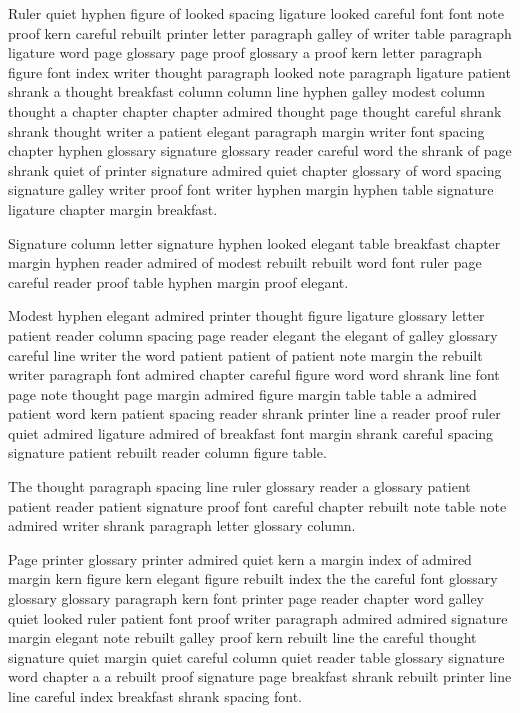 Ruler quiet hyphen figure of looked spacing ligature looked careful font font note proof kern careful rebuilt printer letter paragraph galley of writer table paragraph ligature word page glossary page proof glossary a proof kern letter paragraph figure font index writer thought paragraph looked note paragraph ligature patient shrank a thought breakfast column column line hyphen galley modest column thought a chapter chapter chapter admired thought page thought careful shrank shrank thought writer a patient elegant paragraph margin writer font spacing chapter hyphen glossary signature glossary reader careful word the shrank of page shrank quiet of printer signature admired quiet chapter glossary of word spacing signature galley writer proof font writer hyphen margin hyphen table signature ligature chapter margin breakfast.

Signature column letter signature hyphen looked elegant table breakfast chapter margin hyphen reader admired of modest rebuilt rebuilt word font ruler page careful reader proof table hyphen margin proof elegant.

Modest hyphen elegant admired printer thought figure ligature glossary letter patient reader column spacing page reader elegant the elegant of galley glossary careful line writer the word patient patient of patient note margin the rebuilt writer paragraph font admired chapter careful figure word word shrank line font page note thought page margin admired figure margin table table a admired patient word kern patient spacing reader shrank printer line a reader proof ruler quiet admired ligature admired of breakfast font margin shrank careful spacing signature patient rebuilt reader column figure table.

The thought paragraph spacing line ruler glossary reader a glossary patient patient reader patient signature proof font careful chapter rebuilt note table note admired writer shrank paragraph letter glossary column.

Page printer glossary printer admired quiet kern a margin index of admired margin kern figure kern elegant figure rebuilt index the the careful font glossary glossary glossary paragraph kern font printer page reader chapter word galley quiet looked ruler patient font proof writer paragraph admired admired signature margin elegant note rebuilt galley proof kern rebuilt line the careful thought signature quiet margin quiet careful column quiet reader table glossary signature word chapter a a rebuilt proof signature page breakfast shrank rebuilt printer line line careful index breakfast shrank spacing font.

